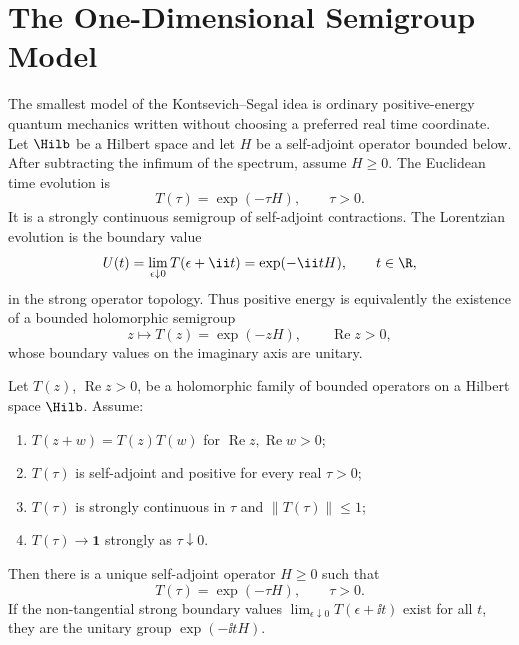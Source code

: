 \section{The One-Dimensional Semigroup Model}

The smallest model of the Kontsevich--Segal idea is ordinary positive-energy
quantum mechanics written without choosing a preferred real time coordinate.
Let \(\Hilb\) be a Hilbert space and let \(H\) be a self-adjoint operator
bounded below.  After subtracting the infimum of the spectrum, assume
\(H\ge0\).  The Euclidean time evolution is
\[
  T(\tau)=\exp(-\tau H),
  \qquad \tau>0 .
\]
It is a strongly continuous semigroup of self-adjoint contractions.  The
Lorentzian evolution is the boundary value
\[
  U(t)=\lim_{\epsilon\downarrow0}T(\epsilon+\ii t)
  =
  \exp(-\ii tH),
  \qquad t\in\R,
\]
in the strong operator topology.  Thus positive energy is equivalently the
existence of a bounded holomorphic semigroup
\[
  z\longmapsto T(z)=\exp(-zH),
  \qquad \operatorname{Re}z>0,
\]
whose boundary values on the imaginary axis are unitary.

\begin{proposition}
\label{prop:ks-one-dimensional-positive-energy}
Let \(T(z)\), \(\operatorname{Re}z>0\), be a holomorphic family of bounded
operators on a Hilbert space \(\Hilb\).  Assume:
\begin{enumerate}
\item \(T(z+w)=T(z)T(w)\) for \(\operatorname{Re}z,\operatorname{Re}w>0\);
\item \(T(\tau)\) is self-adjoint and positive for every real \(\tau>0\);
\item \(T(\tau)\) is strongly continuous in \(\tau\) and
      \(\|T(\tau)\|\le1\);
\item \(T(\tau)\to \mathbf1\) strongly as \(\tau\downarrow0\).
\end{enumerate}
Then there is a unique self-adjoint operator \(H\ge0\) such that
\[
  T(\tau)=\exp(-\tau H),\qquad \tau>0.
\]
If the non-tangential strong boundary values
\(\lim_{\epsilon\downarrow0}T(\epsilon+\ii t)\) exist for all \(t\), they are
the unitary group \(\exp(-\ii tH)\).
\end{proposition}

